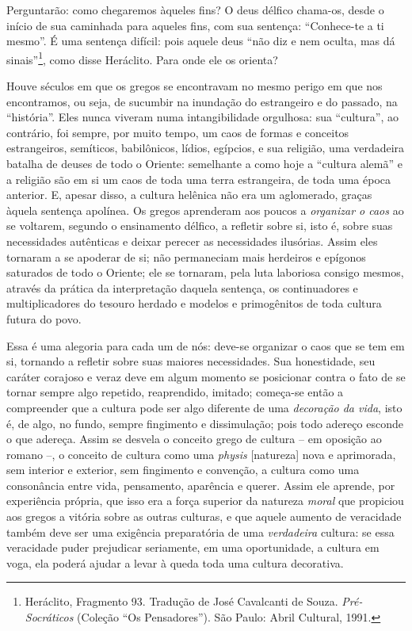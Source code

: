 \begin{enumerate}
\begin{enumerate}
    Perguntarão: como chegaremos àqueles fins? O deus délfico chama-os,
    desde o início de sua caminhada para aqueles fins, com sua sentença:
    ``Conhece-te a ti mesmo''. É uma sentença difícil: pois aquele deus
    ``não diz e nem oculta, mas dá sinais''\footnote{Heráclito,
      Fragmento 93. Tradução de José Cavalcanti de Souza.
      \emph{Pré-Socráticos} (Coleção ``Os Pensadores''). São Paulo:
      Abril Cultural, 1991.}, como disse Heráclito. Para onde ele os
    orienta?

    Houve séculos em que os gregos se encontravam no mesmo perigo em que
    nos encontramos, ou seja, de sucumbir na inundação do estrangeiro e
    do passado, na ``história''. Eles nunca viveram numa intangibilidade
    orgulhosa: sua ``cultura'', ao contrário, foi sempre, por muito
    tempo, um caos de formas e conceitos estrangeiros, semíticos,
    babilônicos, lídios, egípcios, e sua religião, uma verdadeira
    batalha de deuses de todo o Oriente: semelhante a como hoje a
    ``cultura alemã'' e a religião são em si um caos de toda uma terra
    estrangeira, de toda uma época anterior. E, apesar disso, a cultura
    helênica não era um aglomerado, graças àquela sentença apolínea. Os
    gregos aprenderam aos poucos a \emph{organizar o caos} ao se
    voltarem, segundo o ensinamento délfico, a refletir sobre si, isto
    é, sobre suas necessidades autênticas e deixar perecer as
    necessidades ilusórias. Assim eles tornaram a se apoderar de si; não
    permaneciam mais herdeiros e epígonos saturados de todo o Oriente;
    ele se tornaram, pela luta laboriosa consigo mesmos, através da
    prática da interpretação daquela sentença, os continuadores e
    multiplicadores do tesouro herdado e modelos e primogênitos de toda
    cultura futura do povo.

    Essa é uma alegoria para cada um de nós: deve-se organizar o caos
    que se tem em si, tornando a refletir sobre suas maiores
    necessidades. Sua honestidade, seu caráter corajoso e veraz deve em
    algum momento se posicionar contra o fato de se tornar sempre algo
    repetido, reaprendido, imitado; começa-se então a compreender que a
    cultura pode ser algo diferente de uma \emph{decoração da vida},
    isto é, de algo, no fundo, sempre fingimento e dissimulação; pois
    todo adereço esconde o que adereça. Assim se desvela o conceito
    grego de cultura -- em oposição ao romano --, o conceito de cultura
    como uma \emph{physis} {[}natureza{]} nova e aprimorada, sem
    interior e exterior, sem fingimento e convenção, a cultura como uma
    consonância entre vida, pensamento, aparência e querer. Assim ele
    aprende, por experiência própria, que isso era a força superior da
    natureza \emph{moral} que propiciou aos gregos a vitória sobre as
    outras culturas, e que aquele aumento de veracidade também deve ser
    uma exigência preparatória de uma \emph{verdadeira} cultura: se essa
    veracidade puder prejudicar seriamente, em uma oportunidade, a
    cultura em voga, ela poderá ajudar a levar à queda toda uma cultura
    decorativa.
  \end{enumerate}
\end{enumerate}
